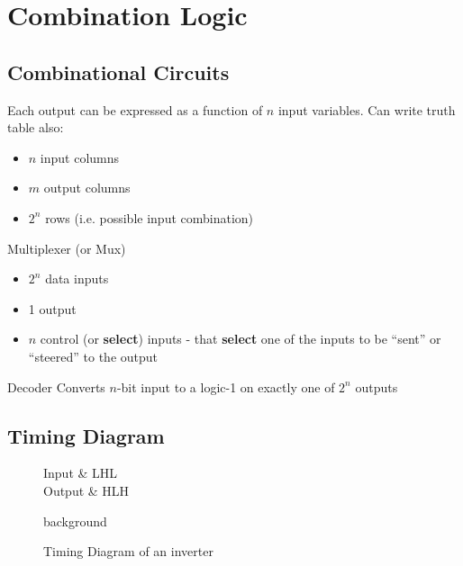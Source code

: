 \section{Combination Logic}
\subsection{Combinational Circuits}
Each output can be expressed as a function of $n$ input variables. Can write truth table also:
\begin{itemize}
	\item $n$ input columns
	\item $m$ output columns
	\item $2^n$ rows (i.e. possible input combination)
\end{itemize}

\begin{note}{Multiplexer (or Mux)}
	\begin{itemize}
		\item $2^n$ data inputs
		\item 1 output
		\item $n$ control (or \textbf{select}) inputs - that \textbf{select} one of the inputs to be ``sent'' or ``steered'' to the output	
	\end{itemize}
\end{note}

\begin{note}{Decoder}
	Converts $n$-bit input to a logic-1 on exactly one of $2^n$ outputs	
\end{note}

\subsection{Timing Diagram}
\begin{figure}[H]
	\begin{tikztimingtable}[timing/slope=0,timing/coldist=2pt,xscale=4,semithick]
		Input & LHL \\
		Output & HLH \\
		\extracode\makeatletter
		\begin{pgfonlayer}{background}
			\begin{scope}
				\horlines{}
			\end{scope}
		\end{pgfonlayer}
	\end{tikztimingtable}
	\centering\caption{Timing Diagram of an inverter}
\end{figure}

